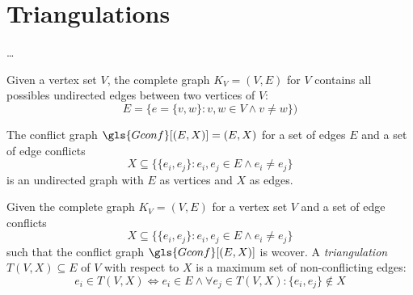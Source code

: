 \chapter{Triangulations}\label{cha:triangulations}
\ldots{}


\begin{definition}
  Given a vertex set \(V\), the complete graph \(K_V=(V,E)\) for \(V\)
  contains all possibles undirected edges between two vertices of
  \(V\):
  \[ E = \{e=\{v,w\} : v,w \in V \land v\not=w\}) \]
\end{definition}


\begin{definition}
  \label{def:conflict_graph}
  The conflict graph \(\gls{Gconf}[(E,X)] = (E,X)\) for a set of
  edges \(E\) and a set of edge conflicts
  \[
    X \subseteq
    \{\{e_i, e_j\} : e_i,e_j \in E \land e_i \not= e_j\}
  \]
  is an undirected graph with \(E\) as vertices and \(X\) as edges.
\end{definition}


\begin{definition}[Triangulation]
  Given the complete graph \(K_V = (V,E)\) for a vertex set \(V\)
  and a set of edge conflicts
  \[
    X \subseteq
    \{\{e_i, e_j\} : e_i,e_j \in E \land e_i \not= e_j\}
  \]
  such that the conflict graph \(\gls{Gconf}[(E,X)]\) is \gls{wcover}.
  A \emph{triangulation} \(T(V,X) \subseteq E\) of \(V\) with respect
  to \(X\) is a maximum set of non-conflicting edges:
  \[
    e_i \in T(V,X)
    \iff e_i \in E
    \land \forall e_j \in T(V,X) : \{e_i,e_j\} \not\in X
  \]
\end{definition}


